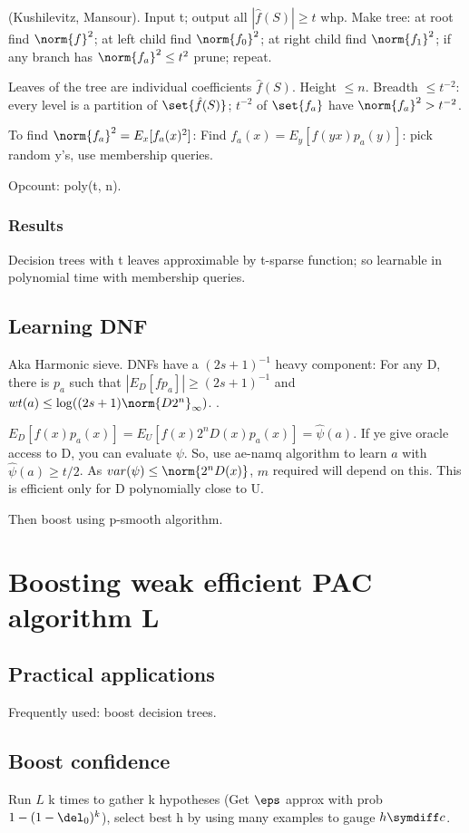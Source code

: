 \documentclass[oneside, article]{memoir}
\begin{document}
(Kushilevitz, Mansour). Input t; output all $|\hat{f}(S)| \geq t$ whp. Make tree: at root find $\norm{f}^{2}$; at left child find $\norm{f_{0}}^{2}$; at right child find $\norm{f_{1}}^{2}$; if any branch has $\norm{f_{a}}^{2} \leq t^{2}$ prune; repeat.

Leaves of the tree are individual coefficients $\hat{f}(S)$. Height $\leq n$. Breadth $\leq t^{-2}$: every level is a partition of $\set{\hat{f}(S)}$; $t^{-2}$ of $\set{f_{a}}$ have $\norm{f_{a}}^{2} > t^{-2}$.

To find $\norm{f_{a}}^{2} = E_{x}[f_{a}(x)^{2}]$: Find $f_{a}(x) = E_{y}[f(yx)p_{a}(y)]$: pick random y's, use membership queries.

Opcount: poly(t, n).

\subsubsection{Results}
Decision trees with t leaves approximable by t-sparse function; so learnable in polynomial time with membership queries.

\subsection{Learning DNF}
Aka Harmonic sieve. DNFs have a $(2s+1)^{-1}$ heavy component: For any D, there is $p_a$ such that $|E_D[f p_a]| \geq (2s+1)^{-1}$ and $wt(a) \leq \log ((2s+1)\norm{D2^n}_{\infty})$. \why.

$E_D[f(x)p_a(x)] = E_U[f(x)2^n D(x)p_a(x)] = \hat{\psi}(a)$. If ye give oracle access to D, you can evaluate $\psi$. So, use ae-namq algorithm to learn $a$ with $\hat{\psi}(a) \geq t/2$. As $var(\psi) \leq \norm{2^n D(x)}$, $m$ required will depend on this. This is efficient only for D polynomially close to U.

Then boost using p-smooth algorithm.

\section{Boosting weak efficient PAC algorithm L}
\subsection{Practical applications}
Frequently used: boost decision trees.

\subsection{Boost confidence}
Run $L$ k times to gather k hypotheses (Get $\eps$ approx with prob $1-(1-\del_0)^{k}$), select best h by using many examples to gauge $h \symdiff c$.
\end{document}
